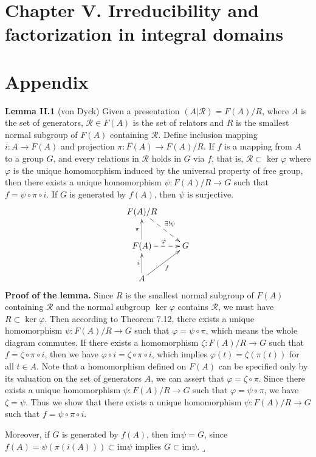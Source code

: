 \documentclass[12pt,letterpaper,boxed]{hmcpset}
\begin{document}
	
\newpage
\section{Chapter V.\hspace{0.2em} Irreducibility and	factorization in integral domains}


\newpage
\section{Appendix}
\hypertarget{Lemma II.1}{}
\textbf{Lemma II.1} (von Dyck)
Given a presentation $(A|\mathscr{R})=F(A)/R$, where $A$ is the set of generators, $\mathscr{R}\in F(A)$ is the set of relators and $R$ is the smallest normal subgroup of $F(A)$ containing $\mathscr{R}$. Define inclusion mapping $i:A\to F(A)$ and projection $\pi:F(A)\to F(A)/R$. If $f$ is a mapping from $A$ to a group $G$, and every relations in $\mathscr{R}$ holds in $G$ via $f$, that is, $\mathscr{R}\subset\ker\varphi$ where $\varphi$ is the unique homomorphism induced by the universal property of free group, then there exists a unique homomorphism $\psi:F(A)/R\to G$ such that $f=\psi\circ\pi\circ i$. If $G$ is generated by $f(A)$, then $\psi$ is surjective.
\[\xymatrix{
	F(A)/R\ar@{-->}[rd]^{\exists!\psi}\\
	F(A)\ar@{-->}[r]^{\varphi}\ar[u]^{\pi} &G\\
	A\ar[ru]_{f}\ar[u]^{i}&    
}\]
\textbf{Proof of the lemma.} Since $R$ is the smallest normal subgroup of $F(A)$ containing $\mathscr{R}$ and the normal subgroup $\ker\varphi$ contains $\mathscr{R}$, we must have $R\subset\ker\varphi$. Then according to Theorem 7.12, there exists a unique homomorphism $\psi:F(A)/R\to G$ such that $\varphi=\psi\circ\pi$, which means the whole diagram commutes. If there exists a homomorphism $\zeta:F(A)/R\to G$ such that $f=\zeta\circ\pi\circ i$, then we have $\varphi\circ i=\zeta\circ\pi\circ i$, which implies $\varphi(t)= \zeta(\pi(t))$ for all $t\in A$. Note that a homomorphism  defined on $F(A)$ can be specified only by its valuation on the set of generators $A$, we can assert that $\varphi=\zeta\circ\pi$. Since there exists a unique homomorphism $\psi:F(A)/R\to G$ such that $\varphi=\psi\circ\pi$, we have $\zeta=\psi$. Thus we show that there exists a unique homomorphism $\psi:F(A)/R\to G$ such that $f=\psi\circ\pi\circ i$.

Moreover, if $G$ is generated by $f(A)$, then $\mathrm{im}\psi=G$, since $f(A)=\psi(\pi( i(A)))\subset\mathrm{im}\psi$ implies $G\subset\mathrm{im}\psi$.\hfill$\lrcorner$


\newpage





\end{document}
